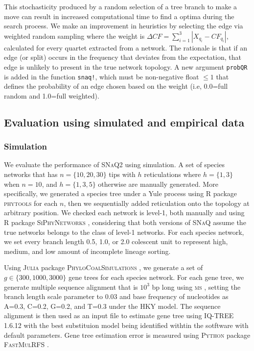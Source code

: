 \documentclass[unnumsec,webpdf,contemporary,large]{oup-authoring-template}%
\theoremstyle{thmstyleone}%
\theoremstyle{thmstyletwo}%
\theoremstyle{thmstylethree}%
\begin{document}
This stochasticity produced by a random selection of a tree branch to make a move can result in increased computational time to find a optima during the search process. We make an improvement in heuristics by selecting the edge via weighted random sampling where the weight is $\Delta CF=\sum^3_{i=1}\left|X_{q_i}-CF_{q_i}\right|$, calculated for every quartet extracted from a network. The rationale is that if an edge (or split) occurs in the frequency that deviates from the expectation, that edge is unlikely to present in the true network topology. A new argument \texttt{probQR} is added in the function \texttt{snaq!}, which must be non-negative float $\le 1$ that defines the probability of an edge chosen based on the weight (i.e, 0.0=full random and 1.0=full weighted).


\subsection{Evaluation using simulated and empirical data}\label{subsec3}
\subsubsection{Simulation}%
We evaluate the performance of \textsc{SNaQ2} using simulation. A set of species networks that has $n=\{10, 20, 30\}$ tips with $h$ reticulations where $h=\{1,3\}$ when $n=10$, and $h=\{1,3,5\}$ otherwise are manually generated. More specifically, we generated a species tree under a Yule process using \textsc{R} package \textsc{phytools} \citep{revell2012} for each $n$, then we sequentially added reticulation onto the topology at arbitrary position. We checked each network is level-1, both manually and using \textsc{R} package \textsc{SiPhyNetworks} \citep{justison2023}, considering that both versions of \textsc{SNaQ} assume the true networks belongs to the class of level-1 networks. For each species network, we set every branch length 0.5, 1.0, or 2.0 colescent unit to represent high, medium, and low amount of incomplete lineage sorting.

Using \textsc{Julia} package \textsc{PhyloCoalSimulations} \citep{fogg2023}, we generate a set of $g\in\{300, 1000, 3000\}$ gene trees for each species network. For each gene tree, we generate multiple sequence alignment that is $10^3$ bp long using \textsc{ms} \citep{hudson2002}, setting the branch length scale parameter to 0.03 and base frequency of nucleotides as A=0.3, C=0.2, G=0.2, and T=0.3 under the HKY model. The sequence alignment is then used as an input file to estimate gene tree using \textsc{IQ-TREE} 1.6.12 \citep{nguyen2015} with the best substituion model being identified withtin the sotftware with default parameters. Gene tree estimation error is measured using \textsc{Python} package \textsc{FastMulRFS} \citep{molloy2020}.
\end{document}
